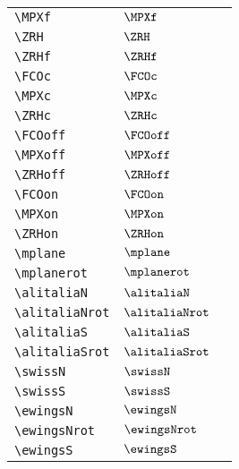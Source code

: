 \begin{longtable}{lll}
 {\color[rgb]{0.5,0.5,0.5}\texttt{\textbackslash MPXf}} & $\MPXf$ & \\ 
 {\color[rgb]{0.5,0.5,0.5}\texttt{\textbackslash ZRH}} & $\ZRH$ & \\ 
 {\color[rgb]{0.5,0.5,0.5}\texttt{\textbackslash ZRHf}} & $\ZRHf$ & \\ 
 {\color[rgb]{0.5,0.5,0.5}\texttt{\textbackslash FCOc}} & $\FCOc$ & \\ 
 {\color[rgb]{0.5,0.5,0.5}\texttt{\textbackslash MPXc}} & $\MPXc$ & \\ 
 {\color[rgb]{0.5,0.5,0.5}\texttt{\textbackslash ZRHc}} & $\ZRHc$ & \\ 
 {\color[rgb]{0.5,0.5,0.5}\texttt{\textbackslash FCOoff}} & $\FCOoff$ & \\ 
 {\color[rgb]{0.5,0.5,0.5}\texttt{\textbackslash MPXoff}} & $\MPXoff$ & \\ 
 {\color[rgb]{0.5,0.5,0.5}\texttt{\textbackslash ZRHoff}} & $\ZRHoff$ & \\ 
 {\color[rgb]{0.5,0.5,0.5}\texttt{\textbackslash FCOon}} & $\FCOon$ & \\ 
 {\color[rgb]{0.5,0.5,0.5}\texttt{\textbackslash MPXon}} & $\MPXon$ & \\ 
 {\color[rgb]{0.5,0.5,0.5}\texttt{\textbackslash ZRHon}} & $\ZRHon$ & \\ 
 {\color[rgb]{0.5,0.5,0.5}\texttt{\textbackslash mplane}} & $\mplane$ & \\ 
 {\color[rgb]{0.5,0.5,0.5}\texttt{\textbackslash mplanerot}} & $\mplanerot$ & \\ 
 {\color[rgb]{0.5,0.5,0.5}\texttt{\textbackslash alitaliaN}} & $\alitaliaN$ & \\ 
 {\color[rgb]{0.5,0.5,0.5}\texttt{\textbackslash alitaliaNrot}} & $\alitaliaNrot$ & \\ 
 {\color[rgb]{0.5,0.5,0.5}\texttt{\textbackslash alitaliaS}} & $\alitaliaS$ & \\ 
 {\color[rgb]{0.5,0.5,0.5}\texttt{\textbackslash alitaliaSrot}} & $\alitaliaSrot$ & \\ 
 {\color[rgb]{0.5,0.5,0.5}\texttt{\textbackslash swissN}} & $\swissN$ & \\ 
 {\color[rgb]{0.5,0.5,0.5}\texttt{\textbackslash swissS}} & $\swissS$ & \\ 
 {\color[rgb]{0.5,0.5,0.5}\texttt{\textbackslash ewingsN}} & $\ewingsN$ & \\ 
 {\color[rgb]{0.5,0.5,0.5}\texttt{\textbackslash ewingsNrot}} & $\ewingsNrot$ & \\ 
 {\color[rgb]{0.5,0.5,0.5}\texttt{\textbackslash ewingsS}} & $\ewingsS$ & \\ 

\end{longtable}
